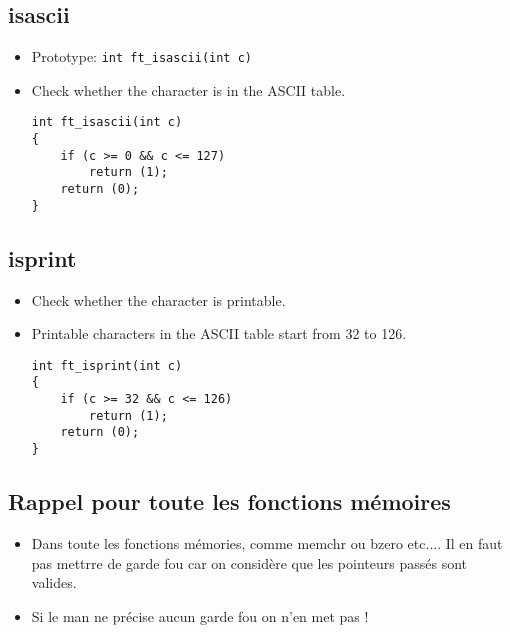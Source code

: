 \documentclass{article}
\begin{document}
		\subsection{isascii}
			\begin{itemize}[label=$\rightarrow$]
				\item Prototype: \texttt{int	ft\_isascii(int c)}
				\item Check whether the character is in the ASCII table.
				\begin{verbatim}
int	ft_isascii(int c)
{
	if (c >= 0 && c <= 127)
		return (1);
	return (0);
}
				\end{verbatim}
			\end{itemize}
		
		\subsection{isprint}
			\begin{itemize}[label=$\rightarrow$]
				\item Check whether the character is printable.
				\item Printable characters in the ASCII table start from 32 to 126.
				\begin{verbatim}
int	ft_isprint(int c)
{
	if (c >= 32 && c <= 126)
		return (1);
	return (0);
}
				\end{verbatim}
			\end{itemize}
		
		\subsection{Rappel pour toute les fonctions mémoires}
			\begin{itemize}
				\item Dans toute les fonctions mémories, comme memchr ou bzero etc.... Il en faut pas mettrre de garde fou car on considère que les pointeurs passés sont valides.
				\item Si le man ne précise aucun garde fou on n'en met pas !
			\end{itemize}
		
\end{document}

